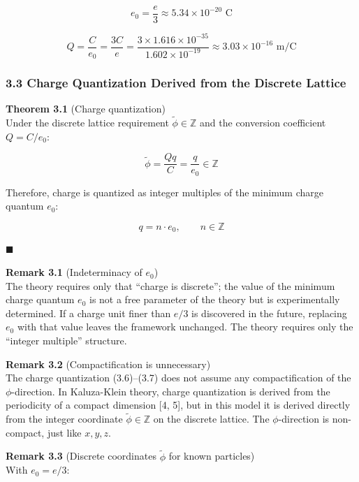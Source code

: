 \documentclass[a4paper,11pt]{article}
\theoremstyle{definition}
\begin{document}
\[e_0 = \frac{e}{3} \approx 5.34 \times 10^{-20} \text{ C} \tag{3.4}\]

\[Q = \frac{C}{e_0} = \frac{3C}{e} = \frac{3 \times 1.616 \times 10^{-35}}{1.602 \times 10^{-19}} \approx 3.03 \times 10^{-16} \text{ m/C} \tag{3.5}\]

\subsubsection{3.3 Charge Quantization Derived from the Discrete Lattice}\label{charge-quantization-derived-from-the-discrete-lattice}

\textbf{Theorem 3.1} (Charge quantization)\\
Under the discrete lattice requirement \(\tilde{\phi} \in \mathbb{Z}\) and the conversion coefficient \(Q = C/e_0\):

\[\tilde{\phi} = \frac{Qq}{C} = \frac{q}{e_0} \in \mathbb{Z} \tag{3.6}\]

Therefore, charge is quantized as integer multiples of the minimum charge quantum \(e_0\):

\[q = n \cdot e_0, \qquad n \in \mathbb{Z} \tag{3.7}\]

\(\blacksquare\)

\textbf{Remark 3.1} (Indeterminacy of \(e_0\))\\
The theory requires only that ``charge is discrete''; the value of the minimum charge quantum \(e_0\) is not a free parameter of the theory but is experimentally determined. If a charge unit finer than \(e/3\) is discovered in the future, replacing \(e_0\) with that value leaves the framework unchanged. The theory requires only the ``integer multiple'' structure.

\textbf{Remark 3.2} (Compactification is unnecessary)\\
The charge quantization (3.6)--(3.7) does not assume any compactification of the \(\phi\)-direction. In Kaluza-Klein theory, charge quantization is derived from the periodicity of a compact dimension {[}4, 5{]}, but in this model it is derived directly from the integer coordinate \(\tilde{\phi} \in \mathbb{Z}\) on the discrete lattice. The \(\phi\)-direction is non-compact, just like \(x, y, z\).

\textbf{Remark 3.3} (Discrete coordinates \(\tilde{\phi}\) for known particles)\\
With \(e_0 = e/3\):
\end{document}
